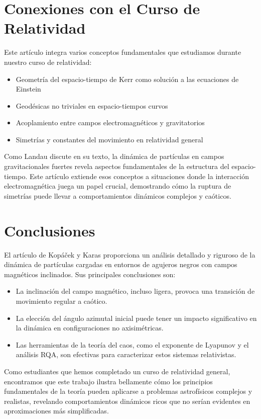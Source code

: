 \documentclass[a4paper,12pt]{article}
\begin{document}
\section{Conexiones con el Curso de Relatividad}

Este artículo integra varios conceptos fundamentales que estudiamos durante nuestro curso de relatividad:

\begin{itemize}
    \item Geometría del espacio-tiempo de Kerr como solución a las ecuaciones de Einstein
    \item Geodésicas no triviales en espacio-tiempos curvos
    \item Acoplamiento entre campos electromagnéticos y gravitatorios
    \item Simetrías y constantes del movimiento en relatividad general
\end{itemize}

Como Landau discute en su texto, la dinámica de partículas en campos gravitacionales fuertes revela aspectos fundamentales de la estructura del espacio-tiempo. Este artículo extiende esos conceptos a situaciones donde la interacción electromagnética juega un papel crucial, demostrando cómo la ruptura de simetrías puede llevar a comportamientos dinámicos complejos y caóticos.

\section{Conclusiones}

El artículo de Kopáček y Karas proporciona un análisis detallado y riguroso de la dinámica de partículas cargadas en entornos de agujeros negros con campos magnéticos inclinados. Sus principales conclusiones son:

\begin{itemize}
    \item La inclinación del campo magnético, incluso ligera, provoca una transición de movimiento regular a caótico.
    \item La elección del ángulo azimutal inicial puede tener un impacto significativo en la dinámica en configuraciones no axisimétricas.
    \item Las herramientas de la teoría del caos, como el exponente de Lyapunov y el análisis RQA, son efectivas para caracterizar estos sistemas relativistas.
\end{itemize}

Como estudiantes que hemos completado un curso de relatividad general, encontramos que este trabajo ilustra bellamente cómo los principios fundamentales de la teoría pueden aplicarse a problemas astrofísicos complejos y realistas, revelando comportamientos dinámicos ricos que no serían evidentes en aproximaciones más simplificadas.
\end{document}
